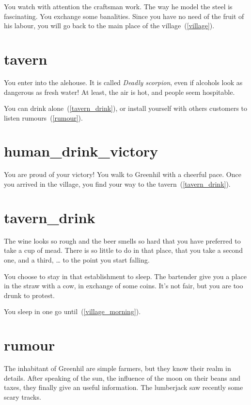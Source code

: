 You watch with attention the craftsman work. The way he model the steel is
fascinating. You exchange some banalities. Since you have no need of the fruit
of his labour, you will go back to the main place of the village~(\ref{village}).

\section{tavern}

You enter into the alehouse. It is called \textit{Deadly scorpion}, even if
alcohols look as dangerous as fresh water! At least, the air is hot, and people
seem hospitable.

You can drink alone~(\ref{tavern_drink}), or install yourself with others
customers to listen rumours~(\ref{rumour}).

\section{human_drink_victory}

You are proud of your victory! You walk to Greenhil with a cheerful pace. Once
you arrived in the village, you find your way to the tavern~(\ref{tavern_drink}).

\section{tavern_drink}

The wine looks so rough and the beer smells so hard that you have preferred to
take a cup of mead. There is so little to do in that place, that you take a
second one, and a third, … to the point you start falling.

You choose to stay in that establishment to sleep. The bartender give you a place in the
straw with a cow, in exchange of some coins. It's not fair, but you are too drunk
to protest.

You sleep in one go until~(\ref{village_morning}).

\section{rumour}

The inhabitant of Greenhil are simple farmers, but they know their realm in
details. After speaking of the sun, the influence of the moon on their beans and
taxes, they finally give an useful information. The lumberjack saw recently
some scary tracks.

